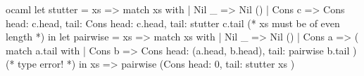 \begin{cminted}{ocaml}
let stutter = xs => 
  match xs with
  | Nil _ => Nil ()
  | Cons c => Cons {
      head: c.head,
      tail: Cons { 
        head: c.head, tail: stutter c.tail 
      }
    } 
(* xs must be of even length *)
in let pairwise = xs => 
  match xs with
  | Nil _ => Nil () 
  | Cons a => (
      match a.tail with 
      | Cons b => Cons { 
          head: (a.head, b.head), tail: pairwise b.tail 
        }
    )
(* type error! *) 
in xs => pairwise (Cons { head: 0, tail: stutter xs }) 
\end{cminted}
